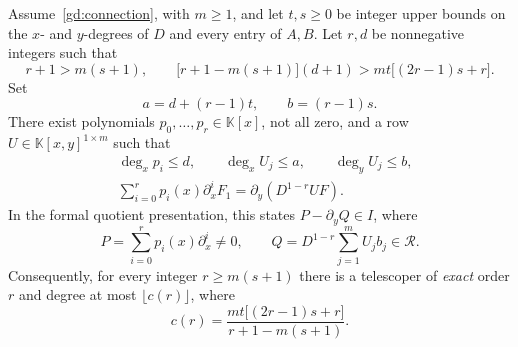 \begin{theorem}\label{gd:curve}
Assume~\eqref{gd:connection}, with $m\ge1$, and let $t,s\ge0$ be integer
upper bounds on the $x$- and $y$-degrees of $D$ and every entry of $A,B$.
Let $r,d$ be nonnegative integers such that
\begin{equation}\label{gd:condition}
 r+1>m(s+1),\qquad
 \bigl[r+1-m(s+1)\bigr](d+1)
   >mt\bigl[(2r-1)s+r\bigr].
\end{equation}
Set
\begin{equation}\label{gd:boxes}
 a=d+(r-1)t,\qquad b=(r-1)s.
\end{equation}
There exist polynomials $p_0,\ldots,p_r\in\mathbb K[x]$, not all zero,
and a row $U\in\mathbb K[x,y]^{1\times m}$ such that
\begin{align}
 &\deg_xp_i\le d,\qquad
   \deg_xU_j\le a,\qquad \deg_yU_j\le b,\label{gd:degrees}\\
 &\sum_{i=0}^r p_i(x)\partial_x^iF_1
    =\partial_y\left(D^{1-r}UF\right).
       \label{gd:telescoping}
\end{align}
In the formal quotient presentation, this states
$P-\partial_yQ\in I$, where
\[
 P=\sum_{i=0}^rp_i(x)\partial_x^i\ne0,\qquad
 Q=D^{1-r}\sum_{j=1}^m U_jb_j\in\mathcal R.
\]
Consequently, for every integer $r\ge m(s+1)$ there is a telescoper
of \emph{exact} order $r$ and degree at most $\lfloor c(r)\rfloor$, where
\begin{equation}\label{gd:hyperbola}
 \boxed{\displaystyle
 c(r)=\frac{mt\bigl[(2r-1)s+r\bigr]}{r+1-m(s+1)}.}
\end{equation}
\end{theorem}

